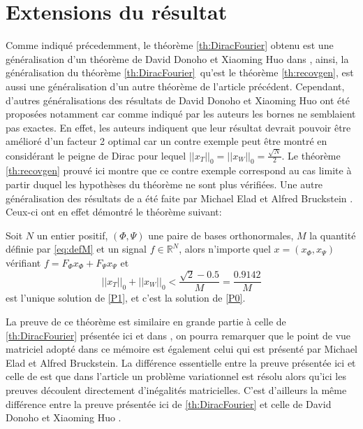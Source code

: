 \section{Extensions du résultat}
Comme indiqué précedemment, le théorème \ref{th:DiracFourier} obtenu est une généralisation d'un théorème de David Donoho et Xiaoming Huo dans \cite{DonohoHuo}, ainsi, la généralisation du théorème \ref{th:DiracFourier} qu'est le théorème \ref{th:recovgen}, est aussi une généralisation d'un autre théorème de l'article précédent.
\newline
Cependant, d'autres généralisations des résultats de David Donoho et Xiaoming Huo ont été proposées notamment car comme indiqué par les auteurs les bornes ne semblaient pas exactes.
\newline
En effet, les auteurs indiquent que leur résultat devrait pouvoir être amélioré d'un facteur 2 optimal car un contre exemple peut être montré en considérant le peigne de Dirac pour lequel $||x_T||_0 = ||x_W||_0 = \frac{\sqrt{N}}{2}$.
Le théorème \ref{th:recovgen} prouvé ici montre que ce contre exemple correspond au cas limite à partir duquel les hypothèses du théorème ne sont plus vérifiées.
\newline
Une autre généralisation des résultats de \cite{DonohoHuo} a été faite par Michael Elad et Alfred Bruckstein \cite{eladBruckstein}. Ceux-ci ont en effet démontré le théorème suivant:
\begin{theoreme}\label{th:eladbruc}
	Soit $N$ un entier positif, $(\Phi, \Psi)$ une paire de bases orthonormales, $M$ la quantité définie par \ref{eq:defM} et un signal $f\in \mathbb{R}^N$, alors n'importe quel $x = (x_\Phi, x_\Psi)$ vérifiant $f = F_\Phi x_\Phi + F_\Psi x_\Psi$ et
	\begin{equation}
		||x_T||_0 + ||x_W||_0 < \frac{\sqrt{2} -0.5}{M} = \frac{0.9142}{M}
	\end{equation}
	est l'unique solution de \ref{P1}, et c'est la solution de \ref{P0}.
\end{theoreme}
La preuve de ce théorème est similaire en grande partie à celle de \ref{th:DiracFourier} présentée ici et dans \cite{DonohoHuo}, on pourra remarquer que le point de vue matriciel adopté dans ce mémoire est également celui qui est présenté par Michael Elad et Alfred Bruckstein.
La différence essentielle entre la preuve présentée ici et celle de \cite{eladBruckstein} est que dans l'article un problème variationnel est résolu alors qu'ici les preuves découlent directement d'inégalités matricielles. 
C'est d'ailleurs la même différence entre la preuve présentée ici de \ref{th:DiracFourier} et celle de David Donoho et Xiaoming Huo \cite{DonohoHuo}.
